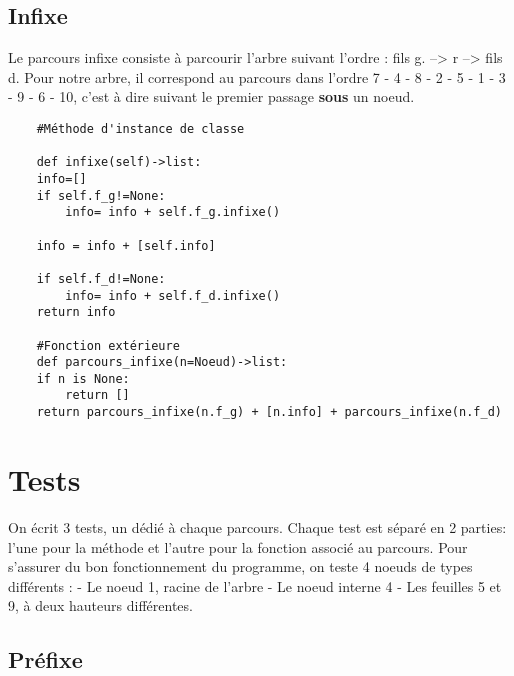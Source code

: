 \documentclass{article}
\begin{document}
\subsection{Infixe}
Le parcours infixe consiste à parcourir l'arbre suivant l'ordre : fils g. --> r --> fils d.
 Pour notre arbre, il correspond au parcours dans 
 l’ordre 7 - 4 - 8 - 2 - 5 - 1 - 3 - 9 - 6 - 10,
 c'est à dire suivant le premier passage \textbf{sous} un noeud.
\renewcommand{\theFancyVerbLine}{
  \sffamily\textcolor[rgb]{0.5,0.5,0.5}{\scriptsize\arabic{FancyVerbLine}}}

\begin{verbatim}
    #Méthode d'instance de classe

    def infixe(self)->list:
    info=[]
    if self.f_g!=None:
        info= info + self.f_g.infixe() 
         
    info = info + [self.info]
    
    if self.f_d!=None:
        info= info + self.f_d.infixe()
    return info
    
    #Fonction extérieure
    def parcours_infixe(n=Noeud)->list:
    if n is None:
        return []
    return parcours_infixe(n.f_g) + [n.info] + parcours_infixe(n.f_d)

\end{verbatim}

\section{Tests}
On écrit 3 tests, un dédié à chaque parcours.
Chaque test est séparé en 2 parties: l'une pour la méthode et l'autre pour la fonction associé au parcours.
Pour s'assurer du bon fonctionnement du programme, on teste 4 noeuds de types différents :
\newline
- Le noeud 1, racine de l'arbre
\newline
- Le noeud interne 4
\newline
- Les feuilles 5 et 9, à deux hauteurs différentes.
\subsection{Préfixe}


\renewcommand{\theFancyVerbLine}{
  \sffamily\textcolor[rgb]{0.5,0.5,0.5}{\scriptsize\arabic{FancyVerbLine}}}
\end{document}
